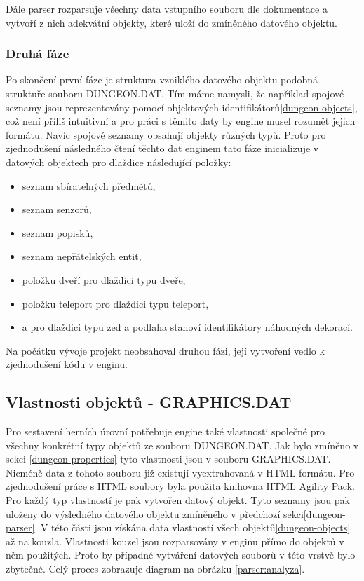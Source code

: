 Dále parser rozparsuje všechny data vstupního souboru dle dokumentace\cite{TechnicalDocumentationFontanel05} a vytvoří z nich 
adekvátní objekty, které uloží do zmíněného datového objektu.

\subsubsection{Druhá fáze}
Po skončení první fáze je struktura vzniklého datového objektu podobná struktuře souboru DUNGEON.DAT. Tím máme namysli, že
například spojové seznamy jsou reprezentovány pomocí objektových identifikátorů\vref{dungeon-objects}, což není příliš intuitivní a pro práci 
s těmito daty by engine musel rozumět jejich formátu. Navíc spojové seznamy obsahují objekty různých typů. Proto pro zjednodušení 
následného čtení těchto dat enginem tato fáze inicializuje v datových objektech pro dlaždice následující položky:
\begin{itemize} 
\item seznam sbíratelných předmětů,
\item seznam senzorů,
\item seznam popisků,
\item seznam nepřátelských entit,
\item položku dveří pro dlaždici typu dveře,
\item položku teleport pro dlaždici typu teleport,
\item a pro dlaždici typu zeď a podlaha stanoví identifikátory náhodných dekorací.
\end{itemize} 

Na počátku vývoje projekt neobsahoval druhou fázi, její vytvoření vedlo k zjednodušení kódu v enginu.

\subsection{Vlastnosti objektů - GRAPHICS.DAT}

Pro sestavení herních úrovní potřebuje engine také vlastnosti společné pro všechny konkrétní typy objektů ze
souboru DUNGEON.DAT. Jak bylo zmíněno v sekci \ref{dungeon-properties} tyto vlastnosti jsou v souboru GRAPHICS.DAT. Nicméně
data z tohoto souboru již existují vyextrahovaná v HTML formátu. Pro zjednodušení práce s HTML soubory byla
použita knihovna HTML Agility Pack\cite{HtmlAgilityPack}. Pro každý typ vlastností je pak vytvořen datový objekt.
Tyto seznamy jsou pak uloženy do výsledného datového objektu zmíněného v předchozí
sekci\ref{dungeon-parser}. V této části jsou získána data vlastností všech objektů\vref{dungeon-objects} až na kouzla.
Vlastnosti kouzel jsou rozparsovány v enginu přímo do objektů v něm použitých. Proto by případné vytváření datových souborů
v této vrstvě bylo zbytečné. Celý proces zobrazuje diagram na obrázku \ref{parser:analyza}.


